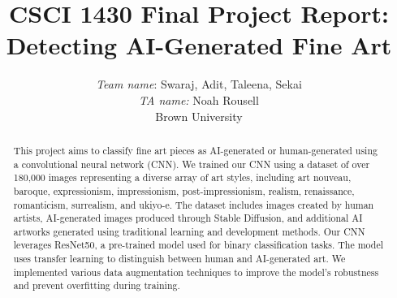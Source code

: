 \title{CSCI 1430 Final Project Report:\\Detecting AI-Generated Fine Art}

\author{
    \emph{Team name}: Swaraj, Adit, Taleena, Sekai\\
    \emph{TA name:} Noah Rousell \\
    Brown University\\
}

\maketitle

\begin{abstract}
\par This project aims to classify fine art pieces as AI-generated or human-generated using a convolutional neural network (CNN). We trained our CNN using a dataset of over 180,000 images representing a diverse array of art styles, including art nouveau, baroque, expressionism, impressionism, post-impressionism, realism, renaissance, romanticism, surrealism, and ukiyo-e. The dataset includes images created by human artists, AI-generated images produced through Stable Diffusion, and additional AI artworks generated using traditional learning and development methods. Our CNN leverages ResNet50, a pre-trained model used for binary classification tasks. The model uses transfer learning to distinguish between human and AI-generated art. We implemented various data augmentation techniques to improve the model's robustness and prevent overfitting during training.
\end{abstract}






